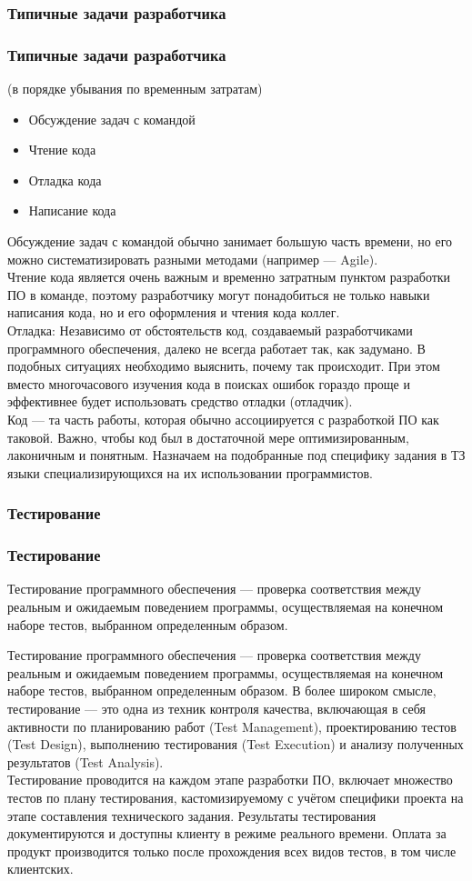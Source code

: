 \documentclass{../industrial-development}
\begin{document}
\subsubsection{Типичные задачи разработчика}
\begin{frame} \frametitle{Типичные задачи разработчика}
	(в порядке убывания по временным затратам)
\begin{itemize}
	\item Обсуждение задач с командой
	\item Чтение кода
	\item Отладка кода
	\item Написание кода
\end{itemize}
\end{frame}
\lecturenotes
Обсуждение задач с командой обычно занимает большую часть времени, но его можно систематизировать разными методами (например --- Agile).\\
Чтение кода является очень важным и временно затратным пунктом разработки ПО в команде, поэтому разработчику могут понадобиться не только навыки написания кода, но и его оформления и чтения кода коллег.\\
Отладка: Независимо от обстоятельств код, создаваемый разработчиками программного обеспечения, далеко не всегда работает так, как задумано. В подобных ситуациях необходимо выяснить, почему так происходит. При этом вместо многочасового изучения кода в поисках ошибок гораздо проще и эффективнее будет использовать средство отладки (отладчик).\\
Код --- та часть работы, которая обычно ассоциируется с разработкой ПО как таковой. Важно, чтобы код был в достаточной мере оптимизированным, лаконичным и понятным. Назначаем на подобранные под специфику задания в ТЗ языки специализирующихся на их использовании программистов.

\subsubsection{Тестирование}
\begin{frame} \frametitle{Тестирование}
Тестирование программного обеспечения — проверка соответствия между реальным и ожидаемым поведением программы, осуществляемая на конечном наборе тестов, выбранном определенным образом.
\end{frame}
\lecturenotes
Тестирование программного обеспечения — проверка соответствия между реальным и ожидаемым поведением программы, осуществляемая на конечном наборе тестов, выбранном определенным образом. В более широком смысле, тестирование — это одна из техник контроля качества, включающая в себя активности по планированию работ (Test Management), проектированию тестов (Test Design), выполнению тестирования (Test Execution) и анализу полученных результатов (Test Analysis).\\
Тестирование проводится на каждом этапе разработки ПО, включает множество тестов по плану тестирования, кастомизируемому с учётом специфики проекта на этапе составления технического задания. Результаты тестирования документируются и доступны клиенту в режиме реального времени. Оплата за продукт производится только после прохождения всех видов тестов, в том числе клиентских.
\end{document}
